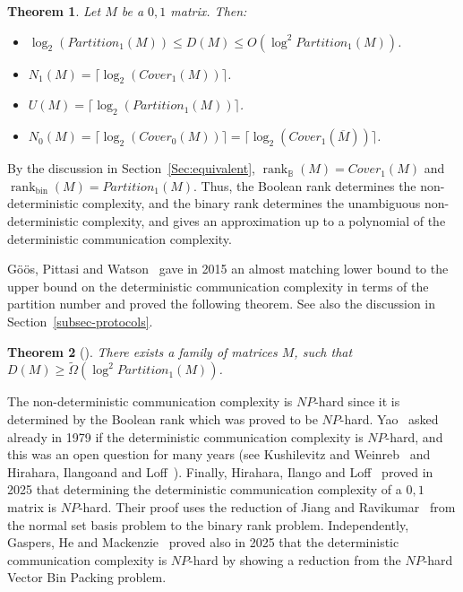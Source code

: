 \documentclass[11pt]{article}
\newtheorem{theorem}{Theorem}
\newcommand{\rank}{\mathop{\mathrm{rank}}}
\newcommand{\Rbool}{{\rank}_\mathbb{B}}
\newcommand{\Rbin}{{\rank}_{\mathrm{bin}}}
\begin{document}
\begin{theorem}
\label{theo-communication-partition}
Let $M$ be a $0,1$ matrix. Then:
\begin{itemize}
\item
$\log_2 (Partition_1(M)) \leq D(M)  \leq O(\log^2 Partition_1(M))$.
\item
$N_1(M) = \lceil \log_2 (Cover_1(M))  \rceil $.
\item
$U(M) = \lceil \log_2 (Partition_1(M)) \rceil$.
\item
$N_0(M) = \lceil \log_2 (Cover_0(M))\rceil = \lceil \log_2 (Cover_1(\overline{M}))  \rceil $.
\end{itemize}
\end{theorem}

By the discussion in Section~\ref{Sec:equivalent}, $\Rbool(M) = Cover_1(M)$ and $\Rbin(M) = Partition_1(M)$. Thus,
the Boolean rank determines the non-deterministic complexity, and the binary rank determines the unambiguous non-deterministic complexity,
and gives an approximation up to a polynomial of the deterministic communication complexity.

G\"{o}\"{o}s, Pittasi and Watson~\cite{Goos} gave in 2015 an almost matching lower bound to
the upper bound on the deterministic communication complexity in terms of the partition number and proved the following theorem.
See also the discussion in Section~\ref{subsec-protocols}.

\begin{theorem}[\cite{Goos}]
\label{theo-deterministic-partition}
There exists a family of matrices $M$, such that $D(M) \geq \widetilde{\Omega}(\log^2 Partition_1(M))$.
\end{theorem}

The non-deterministic communication complexity is  $NP$-hard since it is determined by the Boolean rank which was proved to be $NP$-hard.
Yao~\cite{Yao79} asked already in 1979 if the deterministic communication complexity is  $NP$-hard,
and this was an open question for many years (see Kushilevitz and Weinreb~\cite{kushilevitz2009complexity} and Hirahara, Ilangoand and Loff~\cite{hirahara2021hardness}).
Finally, Hirahara,  Ilango  and Loff~\cite{hirahara2025communication} proved in 2025 that determining  the deterministic communication complexity of a $0,1$ matrix is  $NP$-hard.
Their proof uses the reduction  of Jiang and Ravikumar~\cite{jiang1993minimal} from the normal set basis problem to the binary rank problem.
Independently, Gaspers, He and Mackenzie~\cite{gaspers2025np} proved also in 2025 that the deterministic communication complexity is $NP$-hard by showing a reduction
from the $NP$-hard Vector Bin Packing problem.
\end{document}
